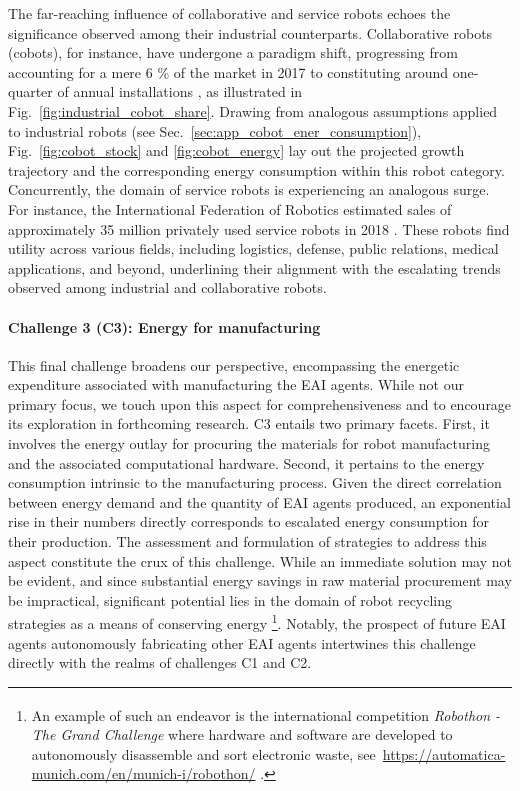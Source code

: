 \documentclass[12pt]{article}
\begin{document}
The far-reaching influence of collaborative and service robots echoes the significance observed among their industrial counterparts. Collaborative robots (cobots), for instance, have undergone a paradigm shift, progressing from accounting for a mere 6 \% of the market in 2017 to constituting around one-quarter of annual installations \cite{tobe2015}, as illustrated in Fig.~\ref{fig:industrial_cobot_share}. Drawing from analogous assumptions applied to industrial robots (see Sec.~\ref{sec:app_cobot_ener_consumption}), Fig.~\ref{fig:cobot_stock} and \ref{fig:cobot_energy} lay out the projected growth trajectory and the corresponding energy consumption within this robot category. Concurrently, the domain of service robots is experiencing an analogous surge. For instance, the International Federation of Robotics estimated sales of approximately 35 million privately used service robots in 2018 \cite{IFR2015}. These robots find utility across various fields, including logistics, defense, public relations, medical applications, and beyond, underlining their alignment with the escalating trends observed among industrial and collaborative robots.

\paragraph*{\textbf{Challenge 3} (C3): Energy for manufacturing}
This final challenge broadens our perspective, encompassing the energetic expenditure associated with manufacturing the EAI agents. While not our primary focus, we touch upon this aspect for comprehensiveness and to encourage its exploration in forthcoming research. C3 entails two primary facets. First, it involves the energy outlay for procuring the materials for robot manufacturing and the associated computational hardware. Second, it pertains to the energy consumption intrinsic to the manufacturing process. Given the direct correlation between energy demand and the quantity of EAI agents produced, an exponential rise in their numbers directly corresponds to escalated energy consumption for their production. The assessment and formulation of strategies to address this aspect constitute the crux of this challenge. While an immediate solution may not be evident, and since substantial energy savings in raw material procurement may be impractical, significant potential lies in the domain of robot recycling strategies as a means of conserving energy \footnote{An example of such an endeavor is the international competition  \textit{Robothon\textsuperscript{\textregistered} - The Grand Challenge} where hardware and software are developed to autonomously disassemble and sort electronic waste, see~\url{https://automatica-munich.com/en/munich-i/robothon/} .}. Notably, the prospect of future EAI agents autonomously fabricating other EAI agents intertwines this challenge directly with the realms of challenges C1 and C2.
\end{document}
